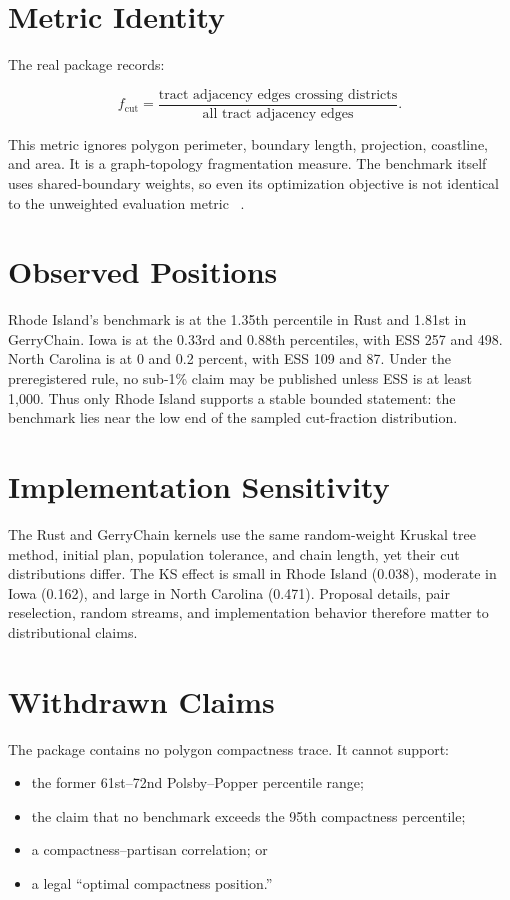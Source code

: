 \section{Metric Identity}

The real package records:

\[
  f_{\mathrm{cut}} =
  \frac{\text{tract adjacency edges crossing districts}}
       {\text{all tract adjacency edges}}.
\]

This metric ignores polygon perimeter, boundary length, projection, coastline,
and area. It is a graph-topology fragmentation measure. The benchmark itself
uses shared-boundary weights, so even its optimization objective is not
identical to the unweighted evaluation metric
~\citep{polsby1991third,reock1961note}.

\section{Observed Positions}

Rhode Island's benchmark is at the 1.35th percentile in Rust and 1.81st in
GerryChain. Iowa is at the 0.33rd and 0.88th percentiles, with ESS 257 and 498.
North Carolina is at 0 and 0.2 percent, with ESS 109 and 87. Under the
preregistered rule, no sub-1\% claim may be published unless ESS is at least
1,000. Thus only Rhode Island supports a stable bounded statement: the
benchmark lies near the low end of the sampled cut-fraction distribution.

\section{Implementation Sensitivity}

The Rust and GerryChain kernels use the same random-weight Kruskal tree method,
initial plan, population tolerance, and chain length, yet their cut
distributions differ. The KS effect is small in Rhode Island (0.038), moderate
in Iowa (0.162), and large in North Carolina (0.471). Proposal details,
pair reselection, random streams, and implementation behavior therefore matter
to distributional claims.

\section{Withdrawn Claims}

The package contains no polygon compactness trace. It cannot support:

\begin{itemize}
\item the former 61st--72nd Polsby--Popper percentile range;
\item the claim that no benchmark exceeds the 95th compactness percentile;
\item a compactness--partisan correlation; or
\item a legal ``optimal compactness position.''
\end{itemize}

